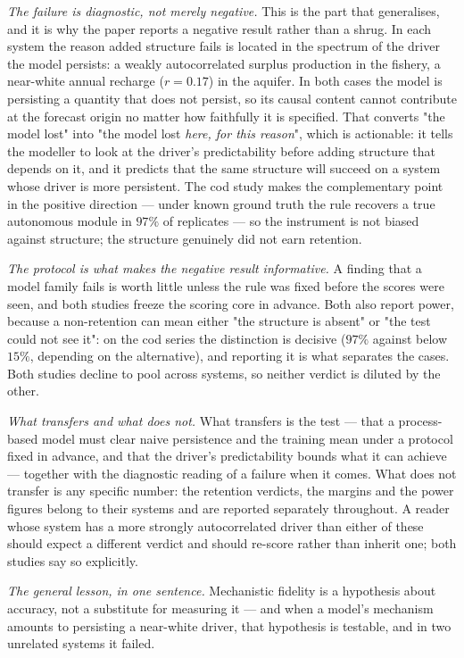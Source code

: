 \documentclass[11pt]{article}
\begin{document}
\emph{The failure is diagnostic, not merely negative.} This is the part that generalises, and it is
why the paper reports a negative result rather than a shrug. In each system the reason added
structure fails is located in the spectrum of the driver the model persists: a weakly
autocorrelated surplus production in the fishery, a near-white annual recharge
(\(r = 0.17\)) in the aquifer. In both cases the model is persisting a quantity that does not
persist, so its causal content cannot contribute at the forecast origin no matter how faithfully it
is specified. That converts "the model lost" into "the model lost \emph{here, for this reason}",
which is actionable: it tells the modeller to look at the driver's predictability before adding
structure that depends on it, and it predicts that the same structure will succeed on a system
whose driver is more persistent. The cod study makes the complementary point in the positive
direction --- under known ground truth the rule recovers a true autonomous module in \(97\%\) of
replicates --- so the instrument is not biased against structure; the structure genuinely did not
earn retention.

\emph{The protocol is what makes the negative result informative.} A finding that a model family
fails is worth little unless the rule was fixed before the scores were seen, and both studies
freeze the scoring core in advance. Both also report power, because a non-retention can mean either
"the structure is absent" or "the test could not see it": on the cod series the distinction is
decisive (\(97\%\) against below \(15\%\), depending on the alternative), and reporting it is what
separates the cases. Both studies decline to pool across systems, so neither verdict is diluted by
the other.

\emph{What transfers and what does not.} What transfers is the test --- that a process-based model
must clear naive persistence and the training mean under a protocol fixed in advance, and that the
driver's predictability bounds what it can achieve --- together with the diagnostic reading of a
failure when it comes. What does not transfer is any specific number: the retention verdicts, the
margins and the power figures belong to their systems and are reported separately throughout. A
reader whose system has a more strongly autocorrelated driver than either of these should expect a
different verdict and should re-score rather than inherit one; both studies say so explicitly.

\emph{The general lesson, in one sentence.} Mechanistic fidelity is a hypothesis about accuracy,
not a substitute for measuring it --- and when a model's mechanism amounts to persisting a
near-white driver, that hypothesis is testable, and in two unrelated systems it failed.
\end{document}
